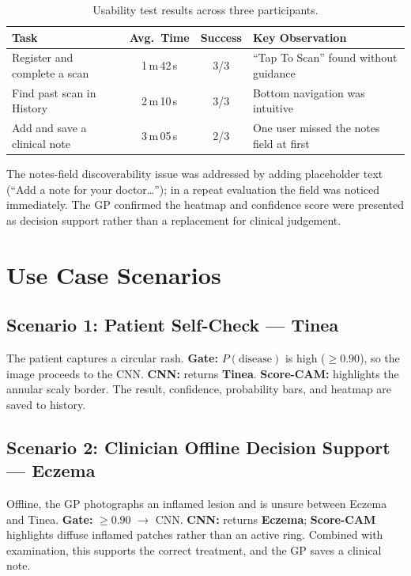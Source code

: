 \begin{table}[H]
\centering
\caption{Usability test results across three participants.}
\label{tab:usability}
\begin{tabular}{|l|c|c|p{5cm}|}
\hline
\textbf{Task} & \textbf{Avg.\ Time} & \textbf{Success} & \textbf{Key Observation} \\ \hline
Register and complete a scan & 1\,m\,42\,s & 3/3 & ``Tap To Scan'' found without guidance \\ \hline
Find past scan in History & 2\,m\,10\,s & 3/3 & Bottom navigation was intuitive \\ \hline
Add and save a clinical note & 3\,m\,05\,s & 2/3 & One user missed the notes field at first \\ \hline
\end{tabular}
\end{table}

\noindent The notes-field discoverability issue was addressed by adding
placeholder text (``Add a note for your doctor\ldots''); in a repeat evaluation
the field was noticed immediately. The GP confirmed the heatmap and confidence
score were presented as decision support rather than a replacement for clinical
judgement.

\section{Use Case Scenarios}

\subsection{Scenario 1: Patient Self-Check — Tinea}
The patient captures a circular rash. \textbf{Gate:} $P(\text{disease})$ is high
($\ge0.90$), so the image proceeds to the CNN. \textbf{CNN:} returns
\textbf{Tinea}. \textbf{Score-CAM:} highlights the annular scaly border. The
result, confidence, probability bars, and heatmap are saved to history.

\subsection{Scenario 2: Clinician Offline Decision Support — Eczema}
Offline, the GP photographs an inflamed lesion and is unsure between Eczema and
Tinea. \textbf{Gate:} $\ge0.90$ $\rightarrow$ CNN. \textbf{CNN:} returns
\textbf{Eczema}; \textbf{Score-CAM} highlights diffuse inflamed patches rather
than an active ring. Combined with examination, this supports the correct
treatment, and the GP saves a clinical note.

